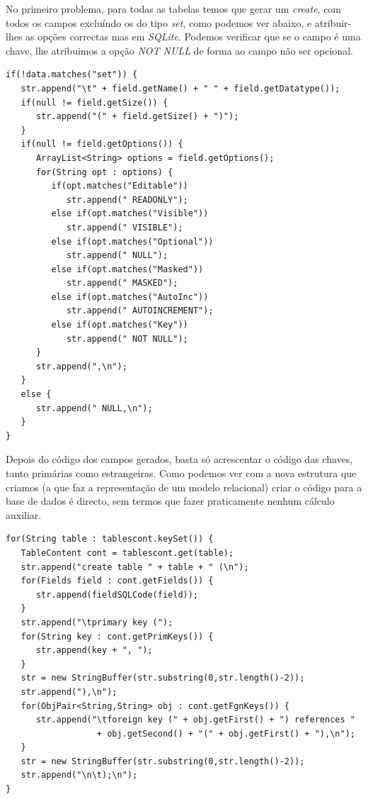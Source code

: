 \documentclass[a4paper]{article}
\begin{document}
\hspace{1cm}No primeiro problema, para todas as tabelas temos que gerar um {\em create}, com todos os campos excluíndo os do tipo {\em set}, como podemos ver abaixo, e atribuir-lhes as opções correctas mas em {\em SQLite}. Podemos verificar que se o campo é uma chave, lhe atribuimos a opção {\em NOT NULL} de forma ao campo não ser opcional.\\

\begin{small}
\begin{lstlisting}
if(!data.matches("set")) {
   str.append("\t" + field.getName() + " " + field.getDatatype());
   if(null != field.getSize()) {
      str.append("(" + field.getSize() + ")");
   }
   if(null != field.getOptions()) {
      ArrayList<String> options = field.getOptions();
      for(String opt : options) {
         if(opt.matches("Editable"))
            str.append(" READONLY");
         else if(opt.matches("Visible"))
            str.append(" VISIBLE");
         else if(opt.matches("Optional"))
            str.append(" NULL");
         else if(opt.matches("Masked"))
            str.append(" MASKED");
         else if(opt.matches("AutoInc"))
            str.append(" AUTOINCREMENT");
         else if(opt.matches("Key"))
            str.append(" NOT NULL");
      }
      str.append(",\n");
   }
   else {
      str.append(" NULL,\n");
   }
}
\end{lstlisting}
\end{small}

\hspace{1cm}Depois do código dos campos gerados, basta só acrescentar o código das chaves, tanto primárias como estrangeiras. Como podemos ver com a nova estrutura que criamos (a que faz a representação de um modelo relacional) criar o código para a base de dados é directo, sem termos que fazer praticamente nenhum cálculo auxiliar.\\

\begin{small}
\begin{lstlisting}
for(String table : tablescont.keySet()) {
   TableContent cont = tablescont.get(table);
   str.append("create table " + table + " (\n");
   for(Fields field : cont.getFields()) {
      str.append(fieldSQLCode(field));
   }
   str.append("\tprimary key (");
   for(String key : cont.getPrimKeys()) {
      str.append(key + ", ");
   }
   str = new StringBuffer(str.substring(0,str.length()-2));
   str.append("),\n");
   for(ObjPair<String,String> obj : cont.getFgnKeys()) {
      str.append("\tforeign key (" + obj.getFirst() + ") references "
                  + obj.getSecond() + "(" + obj.getFirst() + "),\n");
   }
   str = new StringBuffer(str.substring(0,str.length()-2));
   str.append("\n\t);\n");
}
\end{lstlisting}
\end{small}
\end{document}
